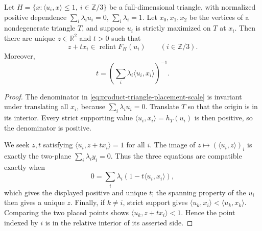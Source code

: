 \begin{unverified}
\begin{lemma}
\label{lem:product-triangle-homothetic-placement}
Let \(H=\{x:\langle u_i,x\rangle\leq1,\ i\in\mathbb Z/3\}\) be a
full-dimensional triangle, with normalized positive dependence
\(\sum_i\lambda_i u_i=0\), \(\sum_i\lambda_i=1\).  Let \(x_0,x_1,x_2\)
be the vertices of a nondegenerate triangle \(T\), and suppose \(u_i\) is
strictly maximized on \(T\) at \(x_i\).  Then there are unique \(z\in\mathbb
R^2\) and \(t>0\) such that
\[
 z+t x_i\in\operatorname{relint}F_H(u_i)
 \qquad(i\in\mathbb Z/3).
\]
Moreover,
\begin{equation}
\label{eq:product-triangle-placement-scale}
 t=\left(\sum_i\lambda_i\langle u_i,x_i\rangle\right)^{-1}.
\end{equation}
\end{lemma}

\begin{proof}
The denominator in \eqref{eq:product-triangle-placement-scale} is invariant
under translating all \(x_i\), because \(\sum_i\lambda_i u_i=0\).  Translate
\(T\) so that the origin is in its interior.  Every strict supporting value
\(\langle u_i,x_i\rangle=h_T(u_i)\) is then positive, so the denominator is
positive.

We seek \(z,t\) satisfying
\(\langle u_i,z+t x_i\rangle=1\) for all \(i\).  The image of
\(z\mapsto(\langle u_i,z\rangle)_i\) is exactly the two-plane
\(\sum_i\lambda_i y_i=0\).  Thus the three equations are compatible exactly
when
\[
 0=\sum_i\lambda_i(1-t\langle u_i,x_i\rangle),
\]
which gives the displayed positive and unique \(t\); the spanning property of
the \(u_i\) then gives a unique \(z\).  Finally, if \(k\neq i\), strict support
gives \(\langle u_k,x_i\rangle<\langle u_k,x_k\rangle\).  Comparing the
two placed points shows
\(\langle u_k,z+t x_i\rangle<1\).  Hence the point indexed by \(i\) is in
the relative interior of its asserted side.
\end{proof}


\end{unverified}
